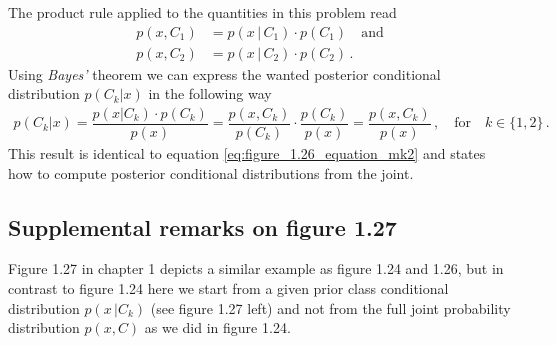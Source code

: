 \documentclass[11pt, DINA4, fleqn]{amsart}
\begin{document}
The product rule applied to the quantities in this problem read
\begin{align}
p(x, C_1) &= p(x\, | \, C_1) \cdot p(C_1) \quad \text{and} \\
p(x, C_2) &= p(x\, | \, C_2) \cdot p(C_2) \, .
\end{align}
Using \emph{Bayes'} theorem we can express the wanted posterior conditional distribution $p(C_k | x)$ in the following way
\begin{align}
p(C_k | x) = \dfrac{p(x | C_k) \cdot p(C_k)}{p(x)} = \dfrac{p(x, C_k)}{p(C_k)} \cdot \dfrac{p(C_k)}{p(x)} = \dfrac{p(x, C_k)}{p(x)} \, , \quad \text{for} \quad k\in\{1,2\} \, .
\end{align}
This result is identical to equation \eqref{eq:figure_1.26_equation_mk2} and states how to compute posterior conditional distributions from the joint.

\subsection{Supplemental remarks on figure 1.27}
Figure 1.27 in chapter 1 depicts a similar example as figure 1.24 and 1.26, but in contrast to figure 1.24 here we start from a given prior class conditional distribution $p(x \, | C_k)$ (see figure 1.27 left) and not from the full joint probability distribution $p(x, C)$ as we did in figure 1.24.
\end{document}
